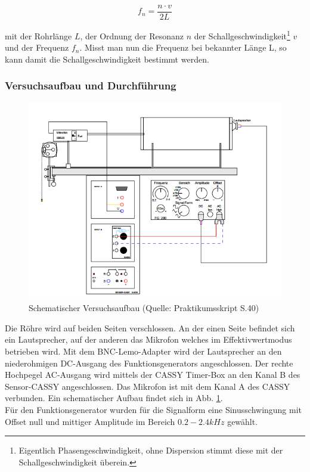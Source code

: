 \documentclass[12pt,a4paper]{article}
\begin{document}
\begin{equation}
f_n=\frac{n\cdot v}{2L}
\end{equation}

mit der Rohrlänge $L$, der Ordnung der Resonanz $n$ der Schallgeschwindigkeit\footnote{Eigentlich Phasengeschwindigkeit, ohne Dispersion stimmt diese mit der Schallgeschwindigkeit überein.}  $v$ und der Frequenz $f_n$.
Misst man nun die Frequenz bei bekannter Länge L, so kann damit die Schallgeschwindigkeit bestimmt werden.\\

\subsubsection{Versuchsaufbau und Durchführung}

\begin{figure}
	\includegraphics[width=\linewidth]{aufbau}
	\caption[Aufbau]{Schematischer Versuchsaufbau (Quelle: Praktikumsskript S.40)}
	\label{fig:aufbseite40}
\end{figure}



Die Röhre wird auf beiden Seiten verschlossen. An der einen Seite befindet sich ein Lautsprecher, auf der anderen das Mikrofon welches im Effektivwertmodus betrieben wird.
Mit dem BNC-Lemo-Adapter wird der Lautsprecher an den niederohmigen DC-Ausgang des Funktionsgenerators angeschlossen. Der rechte Hochpegel AC-Ausgang wird mittels der CASSY Timer-Box an den Kanal B des Sensor-CASSY angeschlossen. Das Mikrofon ist mit dem Kanal A des CASSY verbunden. Ein schematischer Aufbau findet sich in Abb.  \ref{fig:aufbseite40}.\\
Für den Funktionsgenerator wurden für die Signalform eine Sinusschwingung mit Offset null und mittiger Amplitude im Bereich $0.2-2.4 kHz$ gewählt.\\
\end{document}
